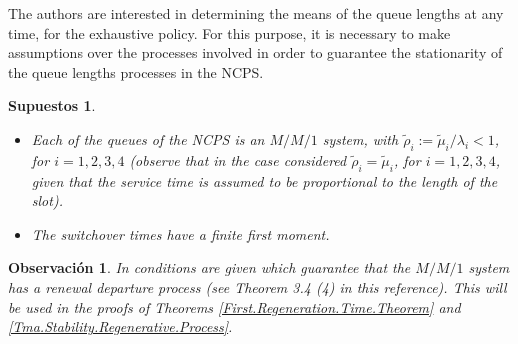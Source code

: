 \documentclass{article}
\newtheorem{Sup}{Supuestos}
\newtheorem{Remark}{Observación}
\begin{document}
The authors are interested in determining the means of the queue lengths at any time, for the exhaustive policy. For this purpose, it is necessary to make assumptions over the processes involved in order to guarantee the stationarity of the queue lengths processes in the NCPS. 
\begin{Sup}\label{Supuestos.Estabilidad}\medskip
\begin{itemize}
\item[\textit{(i)} ] Each of the queues of the NCPS is an $M/M/1$ system, with  $\tilde{\rho}_{i}:=\tilde{\mu}_{i}/\lambda_{i}<1$, for $i=1,2,3,4$ (observe that in the case considered $\tilde{\rho}_{i}=\tilde{\mu}_{i}$, for $i=1,2,3,4$, given that the service time is assumed to be proportional to the length of the slot).
\item[\textit{(ii)} ]  The switchover times have a finite first moment.
\end{itemize}
\end{Sup}
\begin{Remark}\label{Observacion.1}
In \cite{Disney} conditions are given which guarantee that the $M/M/1$ system has a renewal departure process (see Theorem 3.4 (4) in this reference). This will be used in the proofs of Theorems \ref{First.Regeneration.Time.Theorem} and \ref{Tma.Stability.Regenerative.Process}.
\end{Remark}
\end{document}
